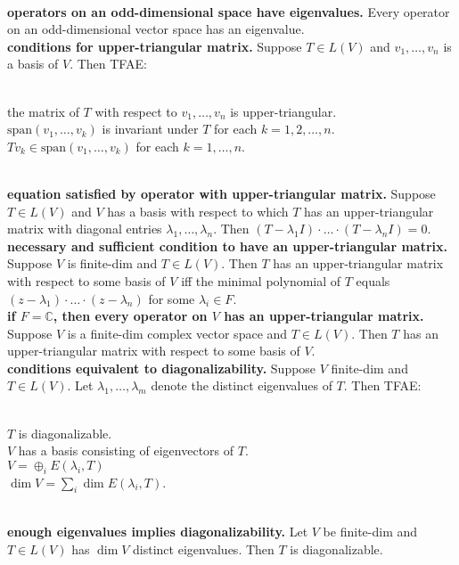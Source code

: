 	\\ \textbf{operators on an odd-dimensional space have eigenvalues. } Every operator on an odd-dimensional vector space has an eigenvalue. 
	\\ \textbf{conditions for upper-triangular matrix. } Suppose $T \in L(V)$ and $v_1,\dots,v_n$ is a basis of $V$. Then TFAE: 
	\begin{enumerate}
		\\ the matrix of $T$ with respect to $v_1,\dots,v_n$ is upper-triangular. 
		\\ $\textrm{span}(v_1,\dots,v_k)$ is invariant under $T$ for each $k = 1,2,\dots,n$. 
		\\ $Tv_k \in \textrm{span}(v_1,\dots,v_k)$ for each $k=1,\dots,n$. 
	\end{enumerate}
	\\ \textbf{equation satisfied by operator with upper-triangular matrix. } Suppose $T \in L(V)$ and $V$ has a basis with respect to which $T$ has an upper-triangular matrix with diagonal entries $\lambda_1,\dots,\lambda_n$. Then $(T-\lambda_1 I) \cdot \dots \cdot (T-\lambda_n I) = 0$. 
	\\ \textbf{necessary and sufficient condition to have an upper-triangular matrix. } Suppose $V$ is finite-dim and $T \in L(V)$. Then $T$ has an upper-triangular matrix with respect to some basis of $V$ iff the minimal polynomial of $T$ equals $(z-\lambda_1) \cdot \dots \cdot (z-\lambda_n)$ for some $\lambda_i \in F$. 
	\\ \textbf{if $F = \mathbb{C}$, then every operator on $V$ has an upper-triangular matrix. } Suppose $V$ is a finite-dim complex vector space and $T \in L(V)$. Then $T$ has an upper-triangular matrix with respect to some basis of $V$. 
	\\ \textbf{conditions equivalent to diagonalizability. } Suppose $V$ finite-dim and $T \in L(V)$. Let $\lambda_1,\dots,\lambda_m$ denote the distinct eigenvalues of $T$. Then TFAE: 
	\begin{enumerate}
		\\ $T$ is diagonalizable. 
		\\ $V$ has a basis consisting of eigenvectors of $T$. 
		\\ $V = \oplus_i E(\lambda_i, T)$
		\\ $\dim V = \sum_i \dim E(\lambda_i,T)$. 
	\end{enumerate}
	\\ \textbf{enough eigenvalues implies diagonalizability. } Let $V$ be finite-dim and $T \in L(V)$ has $\dim V$ distinct eigenvalues. Then $T$ is diagonalizable. 
